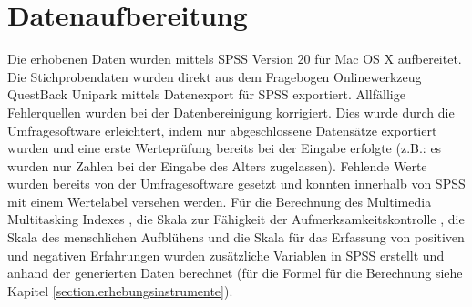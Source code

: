 \section{Datenaufbereitung}\label{section.datenaufbereitung}
Die erhobenen Daten wurden mittels SPSS Version 20 für Mac OS X aufbereitet. Die Stichprobendaten wurden direkt aus dem Fragebogen Onlinewerkzeug QuestBack Unipark mittels Datenexport für SPSS exportiert. Allfällige Fehlerquellen wurden bei der Datenbereinigung korrigiert. Dies wurde durch die Umfragesoftware erleichtert, indem nur abgeschlossene Datensätze exportiert wurden und eine erste Werteprüfung bereits bei der Eingabe erfolgte (z.B.: es wurden nur Zahlen bei der Eingabe des Alters zugelassen). Fehlende Werte wurden bereits von der Umfragesoftware gesetzt und konnten innerhalb von SPSS mit einem Wertelabel versehen werden. Für die Berechnung des Multimedia Multitasking Indexes \cite{Ophir2009}, die Skala zur Fähigkeit der Aufmerksamkeitskontrolle \cite{Posner1998}, die Skala des menschlichen Aufblühens \cite{Diener:2010} und die Skala für das Erfassung von positiven und negativen Erfahrungen \cite{Diener:2010} wurden zusätzliche Variablen in SPSS erstellt und anhand der generierten Daten berechnet (für die Formel für die Berechnung siehe Kapitel \ref{section.erhebungsinstrumente}). 

